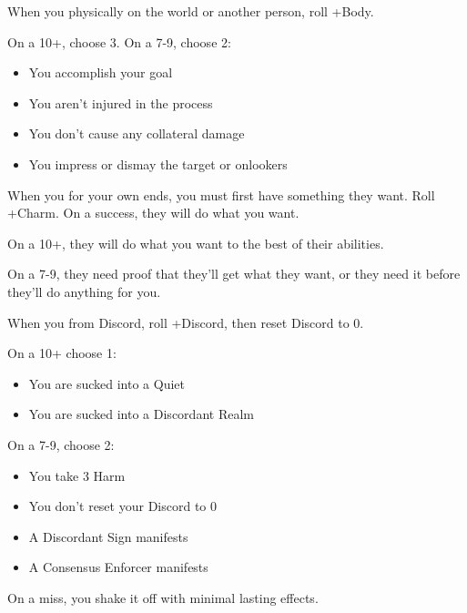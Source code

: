 \begin{multicols}{3}
  \columnbreak
  
  \begin{move}
    When you  physically on the world or another
    person, roll +Body.

    On a 10+, choose 3. On a 7-9, choose 2:
    \begin{itemize}
      \setlength\itemsep{0em}
    \item You accomplish your goal
    \item You aren't injured in the process
    \item You don't cause any collateral damage
    \item You impress or dismay the target or onlookers
    \end{itemize}
  \end{move}

  \SEPARATOR

  \begin{move}
    When you  for your own ends, you must first
    have something they want. Roll +Charm. On a success, they will do
    what you want.

    On a 10+, they will do what you want to the best of their
    abilities.

    On a 7-9, they need proof that they'll get what they want, or they
    need it before they'll do anything for you.
  \end{move}

  \SEPARATOR

  \begin{move}
    When you  from Discord, roll +Discord, then reset
    Discord to 0.

    On a 10+ choose 1:
    \begin{itemize}
      \setlength\itemsep{0em}
    \item You are sucked into a Quiet
    \item You are sucked into a Discordant Realm
    \end{itemize}

    On a 7-9, choose 2:
    \begin{itemize}
      \setlength\itemsep{0em}
    \item You take 3 Harm
    \item You don't reset your Discord to 0
    \item A Discordant Sign manifests
    \item A Consensus Enforcer manifests
    \end{itemize}

    On a miss, you shake it off with minimal lasting effects.
  \end{move}

\end{multicols}

